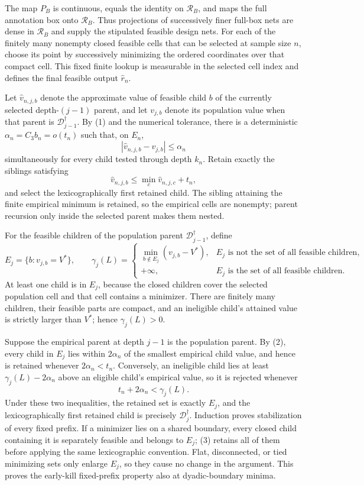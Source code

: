 The map \(P_B\) is continuous, equals the identity on \(\mathcal R_B\), and maps the full annotation box onto \(\mathcal R_B\).  Thus projections of successively finer full-box nets are dense in \(\mathcal R_B\) and supply the stipulated feasible design nets.  For each of the finitely many nonempty closed feasible cells that can be selected at sample size \(n\), choose its point by successively minimizing the ordered coordinates over that compact cell.  This fixed finite lookup is measurable in the selected cell index and defines the final feasible output \(\widehat r_n\).

Let \(\widehat v_{n,j,b}\) denote the approximate value of feasible child \(b\) of the currently selected depth-\((j-1)\) parent, and let \(v_{j,b}\) denote its population value when that parent is \(\mathcal D_{j-1}^\dagger\).  By (1) and the numerical tolerance, there is a deterministic \(\alpha_n=C_3b_n=o(t_n)\) such that, on \(E_n\),
\[
|\widehat v_{n,j,b}-v_{j,b}|\le\alpha_n
\tag{2}
\]
simultaneously for every child tested through depth \(k_n\).  Retain exactly the siblings satisfying
\[
\widehat v_{n,j,b}
\le\min_c\widehat v_{n,j,c}+t_n,
\tag{3}
\]
and select the lexicographically first retained child.  The sibling attaining the finite empirical minimum is retained, so the empirical cells are nonempty; parent recursion only inside the selected parent makes them nested.

For the feasible children of the population parent \(\mathcal D_{j-1}^\dagger\), define
\[
E_j=\{b:v_{j,b}=V^*\},
\qquad
\gamma_j(L)=
\begin{cases}
\min_{b\notin E_j}(v_{j,b}-V^*),&E_j\text{ is not the set of all feasible children},\\
+\infty,&E_j\text{ is the set of all feasible children}.
\end{cases}
\tag{4}
\]
At least one child is in \(E_j\), because the closed children cover the selected population cell and that cell contains a minimizer.  There are finitely many children, their feasible parts are compact, and an ineligible child's attained value is strictly larger than \(V^*\); hence \(\gamma_j(L)>0\).

Suppose the empirical parent at depth \(j-1\) is the population parent.  By (2), every child in \(E_j\) lies within \(2\alpha_n\) of the smallest empirical child value, and hence is retained whenever \(2\alpha_n<t_n\).  Conversely, an ineligible child lies at least \(\gamma_j(L)-2\alpha_n\) above an eligible child's empirical value, so it is rejected whenever
\[
t_n+2\alpha_n<\gamma_j(L).
\tag{5}
\]
Under these two inequalities, the retained set is exactly \(E_j\), and the lexicographically first retained child is precisely \(\mathcal D_j^\dagger\).  Induction proves stabilization of every fixed prefix.  If a minimizer lies on a shared boundary, every closed child containing it is separately feasible and belongs to \(E_j\); (3) retains all of them before applying the same lexicographic convention.  Flat, disconnected, or tied minimizing sets only enlarge \(E_j\), so they cause no change in the argument.  This proves the early-kill fixed-prefix property also at dyadic-boundary minima.

